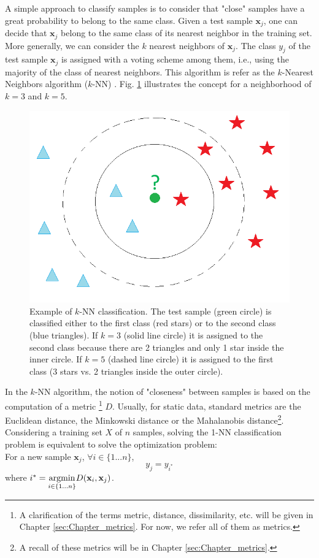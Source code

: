 A simple approach to classify samples is to consider that "close" samples have a great probability to belong to the same class. Given a test sample $\textbf{x}_j$, one can decide that $\textbf{x}_j$ belong to the same class of its nearest neighbor in the training set. More generally, we can consider the $k$ nearest neighbors of $\textbf{x}_j$. The class $y_j$ of the test sample $\textbf{x}_j$ is assigned with a voting scheme among them, i.e., using the majority of the class of nearest neighbors. This algorithm is refer as the $k$-Nearest Neighbors algorithm ($k$-NN) 
\cite{Silverman1989,Cover1967b}. Fig. \ref{fig:kNN_example} illustrates the concept for a neighborhood of $k=3$ and $k=5$.

\begin{figure}[h!]
\centering
\includegraphics[width=0.45\linewidth]{images/kNN_example}
\caption{Example of $k$-NN classification. The test sample (green circle) is classified either to the first class (red stars) or to the second class (blue triangles). If $k = 3$ (solid line circle) it is assigned to the second class because there are 2 triangles and only 1 star inside the inner circle. If $k = 5$ (dashed line circle) it is assigned to the first class (3 stars vs. 2 triangles inside the outer circle).}
\label{fig:kNN_example}
\end{figure}

\noindent In the $k$-NN algorithm, the notion of "closeness" between samples is based on the computation of a metric \footnote{A clarification of the terms metric, distance, dissimilarity, etc. will be given in Chapter \ref{sec:Chapter_metrics}. For now, we refer all of them as metrics.} $D$. Usually, for static data, standard metrics are the Euclidean distance, the Minkowski distance or the Mahalanobis distance\footnote{A recall of these metrics will be in Chapter \ref{sec:Chapter_metrics}.}. Considering a training set $X$ of $n$ samples, solving the 1-NN classification problem is equivalent to solve the optimization problem: \\
\noindent For a new sample $\textbf{x}_j$, $\forall i \in \{1...n\}$,
\begin{equation}
y_j = y_{i^*}
\end{equation}
where $i^*={\underset{i \in \{1...n\}}{\argmin}   D(\textbf{x}_i,\textbf{x}_j)}$.

